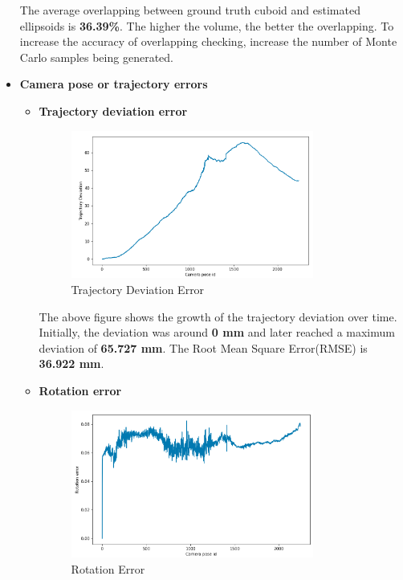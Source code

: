 \documentclass[report.tex]{subfiles}
\begin{document}
\begin{itemize}
The average overlapping between ground truth cuboid and estimated ellipsoids is \textbf{36.39\%}. The higher the volume, the better the overlapping. To increase the accuracy of overlapping checking, increase the number of Monte Carlo samples being generated.

    \item \textbf{Camera pose or trajectory errors}
    \begin{itemize}
        \item \textbf{Trajectory deviation error}
\begin{figure}[H]
\centering
\includegraphics[width=0.8\textwidth] {Images/traj_deviation.png}
\caption{\centering Trajectory Deviation Error}
\label{fig:Trajectory_Deviation_Error}
\end{figure}
The above figure shows the growth of the trajectory deviation over time. Initially, the deviation was around \textbf{0 mm} and later reached a maximum deviation of \textbf{65.727 mm}. The Root Mean Square Error(RMSE) is \textbf{36.922 mm}.
        \item \textbf{Rotation error}
\begin{figure}[H]
\centering
\includegraphics[width=0.8\textwidth] {Images/rot_error.png}
\caption{\centering Rotation Error}
\label{fig:Rotation_Error}
\end{figure}

\end{itemize}
\end{itemize}
\end{document}
